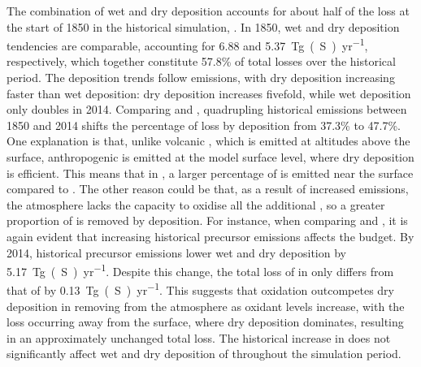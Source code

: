 The combination of wet and dry deposition accounts for about half of the  loss at the start of 1850 in the historical simulation, \histsst{}. In 1850, wet and dry deposition tendencies are comparable, accounting for \num[]{6.88} and \qty{5.37}{Tg(S)~yr^{-1}}, respectively, which together constitute 57.8\% of total  losses over the historical period. The deposition trends follow  emissions, with dry deposition increasing faster than wet deposition: dry deposition increases fivefold, while wet deposition only doubles in 2014. Comparing \histsst{} and \sstpiaer{}, quadrupling historical  emissions between 1850 and 2014 shifts the percentage of  loss by deposition from 37.3\% to 47.7\%. One explanation is that, unlike volcanic , which is emitted at altitudes above the surface, anthropogenic  is emitted at the model surface level, where dry deposition is efficient. This means that in \histsst{}, a larger percentage of  is emitted near the surface compared to \sstpiaer{}. The other reason could be that, as a result of increased  emissions, the atmosphere lacks the capacity to oxidise all the additional , so a greater proportion of  is removed by deposition. For instance, when comparing \histsst{} and \sstpio{}, it is again evident that increasing historical  precursor emissions affects the  budget. By 2014, historical  precursor emissions lower  wet and dry deposition by \qty{5.17}{Tg(S)~yr^{-1}}. Despite this change, the total loss of  in \histsst{} only differs from that of \sstpio{}  by \qty{0.13}{Tg(S)~yr^{-1}}. This suggests that oxidation outcompetes dry deposition in removing  from the atmosphere as oxidant levels increase, with the loss occurring away from the surface, where dry deposition dominates, resulting in an approximately unchanged total loss. The historical increase in  does not significantly affect wet and dry deposition of  throughout the simulation period.


